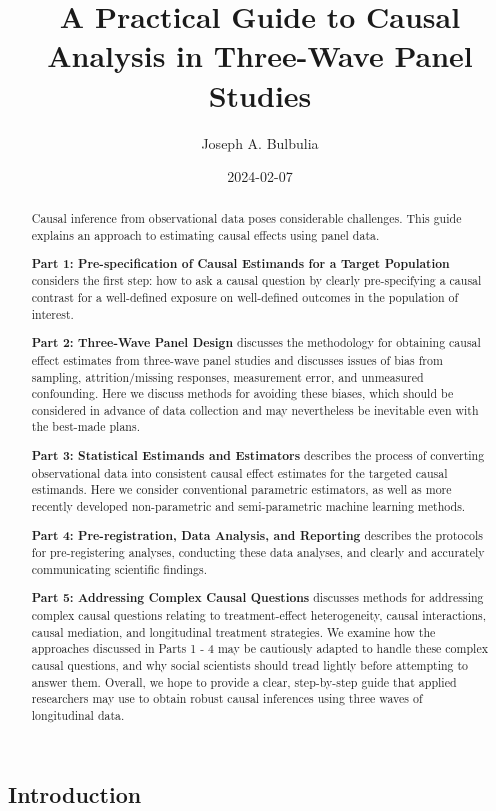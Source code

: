 \documentclass[
  singlecolumn]{article}
\title{A Practical Guide to Causal Analysis in Three-Wave Panel Studies}
\author{Joseph A. Bulbulia}
\date{2024-02-07}
\begin{document}
\maketitle
\begin{abstract}
Causal inference from observational data poses considerable challenges.
This guide explains an approach to estimating causal effects using panel
data.

\textbf{Part 1: Pre-specification of Causal Estimands for a Target
Population} considers the first step: how to ask a causal question by
clearly pre-specifying a causal contrast for a well-defined exposure on
well-defined outcomes in the population of interest.

\textbf{Part 2: Three-Wave Panel Design} discusses the methodology for
obtaining causal effect estimates from three-wave panel studies and
discusses issues of bias from sampling, attrition/missing responses,
measurement error, and unmeasured confounding. Here we discuss methods
for avoiding these biases, which should be considered in advance of data
collection and may nevertheless be inevitable even with the best-made
plans.

\textbf{Part 3: Statistical Estimands and Estimators} describes the
process of converting observational data into consistent causal effect
estimates for the targeted causal estimands. Here we consider
conventional parametric estimators, as well as more recently developed
non-parametric and semi-parametric machine learning methods.

\textbf{Part 4: Pre-registration, Data Analysis, and Reporting}
describes the protocols for pre-registering analyses, conducting these
data analyses, and clearly and accurately communicating scientific
findings.

\textbf{Part 5: Addressing Complex Causal Questions} discusses methods
for addressing complex causal questions relating to treatment-effect
heterogeneity, causal interactions, causal mediation, and longitudinal
treatment strategies. We examine how the approaches discussed in Parts 1
- 4 may be cautiously adapted to handle these complex causal questions,
and why social scientists should tread lightly before attempting to
answer them. Overall, we hope to provide a clear, step-by-step guide
that applied researchers may use to obtain robust causal inferences
using three waves of longitudinal data.
\end{abstract}

\subsection{Introduction}\label{introduction}
\end{document}
